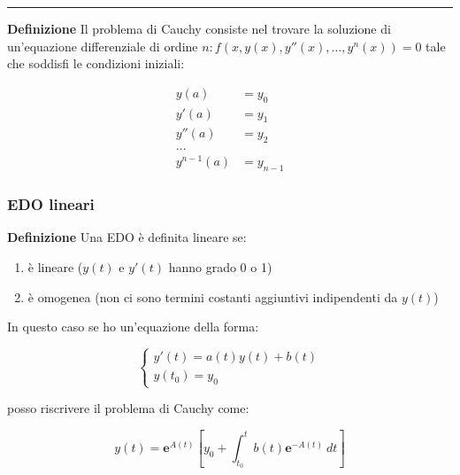 \documentclass{article}
\begin{document}
\noindent\rule{\textwidth}{0.5pt}\newline

\noindent\textbf{Definizione} Il problema di Cauchy consiste nel trovare la soluzione di un'equazione differenziale di ordine $n:f(x,y(x),y''(x),\ldots,y^n(x))=0$ tale che soddisfi le condizioni iniziali:

\begin{equation}
    \nonumber
    \begin{split}
        y(a)&=y_0\\
        y'(a)&=y_1\\
        y''(a)&=y_2\\
        \ldots\\
        y^{n-1}(a)&=y_{n-1}
    \end{split}
\end{equation}

\subsubsection{EDO lineari}

\textbf{Definizione} Una EDO è definita lineare se:
\begin{enumerate}
    \item è lineare ($y(t)$ e $y'(t)$ hanno grado 0 o 1)
    \item è omogenea (non ci sono termini costanti aggiuntivi indipendenti da $y(t)$)\newline
\end{enumerate}

\noindent In questo caso se ho un'equazione della forma:

\[
\begin{cases}
    y'(t)=a(t)y(t)+b(t)\\
    y(t_0)=y_0
\end{cases}
\]\newline

\noindent posso riscrivere il problema di Cauchy come:

$$y(t)=\mathbf{e}^{A(t)}\left[y_0+\int_{t_0}^tb(t)\mathbf{e}^{-A(t)}\ dt\right]$$
\end{document}
